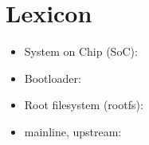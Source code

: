 \chapter*{Lexicon}

\begin{itemize}
\item System on Chip (SoC):
\item Bootloader:
\item Root filesystem (rootfs):
\item mainline, upstream:
\end{itemize}
